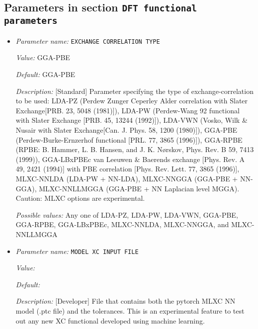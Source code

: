 \subsection{Parameters in section \tt DFT functional parameters}
\label{parameters:DFT_20functional_20parameters}

\begin{itemize}
\item {\it Parameter name:} {\tt EXCHANGE CORRELATION TYPE}
\label{parameters:DFT functional parameters/EXCHANGE CORRELATION TYPE}
\label{parameters:DFT_20functional_20parameters/EXCHANGE_20CORRELATION_20TYPE}


{\it Value:} GGA-PBE


{\it Default:} GGA-PBE


{\it Description:} [Standard] Parameter specifying the type of exchange-correlation to be used: LDA-PZ (Perdew Zunger Ceperley Alder correlation with Slater Exchange[PRB. 23, 5048 (1981)]), LDA-PW (Perdew-Wang 92 functional with Slater Exchange [PRB. 45, 13244 (1992)]), LDA-VWN (Vosko, Wilk \& Nusair with Slater Exchange[Can. J. Phys. 58, 1200 (1980)]), GGA-PBE (Perdew-Burke-Ernzerhof functional [PRL. 77, 3865 (1996)]), GGA-RPBE (RPBE: B. Hammer, L. B. Hansen, and J. K. Nørskov, Phys. Rev. B 59, 7413 (1999)), GGA-LBxPBEc van Leeuwen \& Baerends exchange [Phys. Rev. A 49, 2421 (1994)] with  PBE correlation [Phys. Rev. Lett. 77, 3865 (1996)], MLXC-NNLDA (LDA-PW + NN-LDA), MLXC-NNGGA (GGA-PBE + NN-GGA), MLXC-NNLLMGGA (GGA-PBE + NN Laplacian level MGGA). Caution: MLXC options are experimental.


{\it Possible values:} Any one of LDA-PZ, LDA-PW, LDA-VWN, GGA-PBE, GGA-RPBE, GGA-LBxPBEc, MLXC-NNLDA, MLXC-NNGGA, and MLXC-NNLLMGGA
\item {\it Parameter name:} {\tt MODEL XC INPUT FILE}
\label{parameters:DFT functional parameters/MODEL XC INPUT FILE}
\label{parameters:DFT_20functional_20parameters/MODEL_20XC_20INPUT_20FILE}


{\it Value:} 


{\it Default:} 


{\it Description:} [Developer] File that contains both the pytorch MLXC NN model (.ptc file) and the tolerances. This is an experimental feature to test out any new XC functional developed using machine learning.


\end{itemize}
